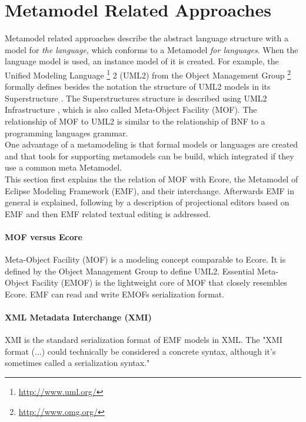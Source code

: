 \section{Metamodel Related Approaches} \label{sec:metaApproaches}
Metamodel related approaches describe the abstract language structure with a model for \emph{the language}, which conforms to a Metamodel \emph{for languages}. When the language model is used, an instance model of it is created. For example, the Unified Modeling Language \footnote{\raggedright \url{http://www.uml.org/}}  2 (UML2) from the Object Management Group \footnote{\raggedright \url{http://www.omg.org/}} formally defines besides the notation the structure of UML2 models in its Superstructure \cite{Uml23s}. The Superstructures structure is described using UML2 Infrastructure \cite{Uml23i}, which is also called Meta-Object Facility (MOF). The relationship of MOF to UML2 is similar to the relationship of BNF to a programming languages grammar.\\
One advantage of a metamodeling is that formal models or languages are created and that tools for supporting metamodels can be build, which integrated if they use a common meta Metamodel.\\

This section first explains the the relation of MOF with Ecore, the Metamodel of Eclipse Modeling Framework (EMF), and their interchange. Afterwards EMF in general is explained, following by a description of projectional editors based on EMF and then EMF related textual editing is addressed.

\paragraph{MOF versus Ecore}
Meta-Object Facility (MOF) is a modeling concept comparable to Ecore. It is defined by the Object Management Group \cite{OMG} to define UML2. Essential Meta-Object Facility (EMOF) is the lightweight core of MOF that closely resembles Ecore. EMF can read and write EMOFs serialization format. \cite{EMP}

\paragraph{XML Metadata Interchange (XMI)}
XMI is the standard serialization format of EMF models in XML. The "XMI format (...) could technically be considered a concrete syntax, although it's sometimes called a serialization syntax." \cite{EMP}


